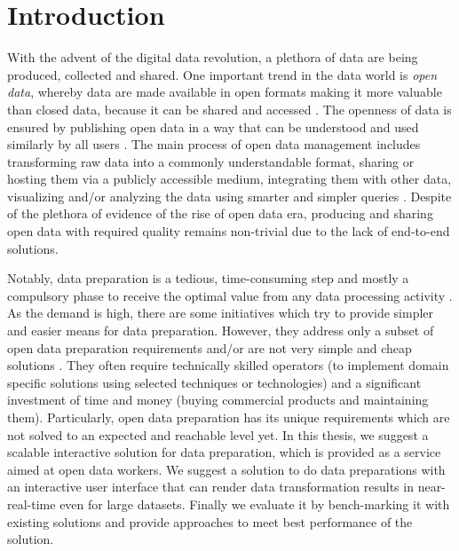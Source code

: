 
\chapter{Introduction} %
\label{Chapter1} %



\noindent With the advent of the digital data revolution, a plethora of data are being produced, collected and shared. One important trend in the data world is \textit{open data}, whereby data are made available in open formats making it more valuable  than closed data, because it can be shared and accessed \citep{opendataunlockinginnovation}. The openness of data is ensured by publishing open data in a way that can be understood and used similarly by all users \cite{opendatahandbook}. The main process of open data management includes transforming raw data into a commonly understandable format, sharing or hosting them via a publicly accessible medium, integrating them with other data, visualizing and/or analyzing the data using smarter and simpler queries \cite{howlinkeddataistransforminggovernment}. Despite of the plethora of evidence of the rise of open data era, producing and sharing  open data with required quality remains non-trivial \cite{towardsopendatadevelopmentmodelforlinkeddata} due to the lack of end-to-end solutions. 

\noindent Notably, data preparation is a tedious, time-consuming step and mostly a compulsory phase to receive the optimal value from any data processing activity \cite{datapreparationfordatamining}. As the demand is high, there are some initiatives which try to provide simpler and easier means for data preparation. However, they address only a subset of open data preparation requirements and/or are not very simple and cheap solutions \cite{ligthweightopendatatransformation, cleaningprobsandapproaches, declarativedatacleaning, visualizationsandtransformationsinwrangling}. They often require technically skilled operators (to implement domain specific solutions using selected techniques or technologies) and a significant investment of time and money (buying commercial products and maintaining them). Particularly, open data preparation has its unique requirements which are not solved to an expected and reachable level yet. In this thesis, we suggest a scalable interactive solution for data preparation, which is provided as a service aimed at open data workers. We suggest a solution to do data preparations with an interactive user interface that can render data transformation results in near-real-time even for large datasets. Finally we evaluate it by bench-marking it with existing solutions and provide approaches to meet best performance of the solution.

